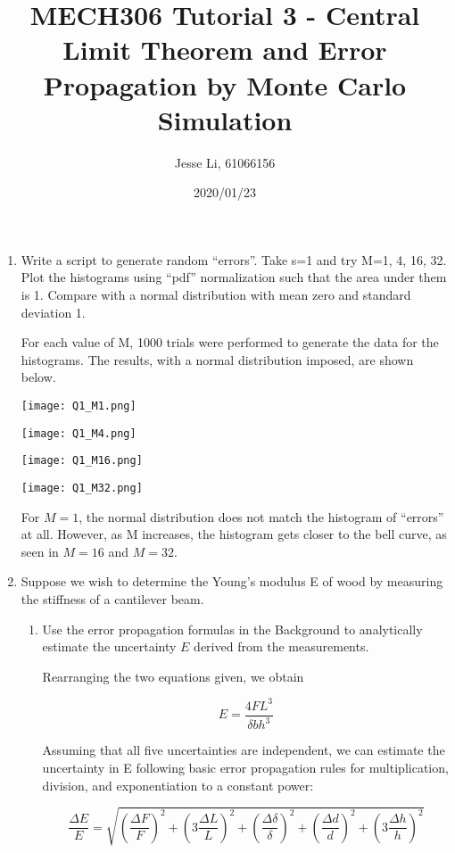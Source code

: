 \documentclass{article}
\begin{document}
\author{Jesse Li, 61066156}
\date{2020/01/23}
\title{MECH306 Tutorial 3 - Central Limit Theorem and Error Propagation by Monte Carlo Simulation}

\maketitle

\begin{enumerate}
    \item Write a script to generate random “errors”. Take s=1 and try M=1, 4, 16, 32. Plot the histograms using “pdf” normalization such that the area under them is 1. Compare with a normal distribution with mean zero and standard deviation 1.


For each value of M, 1000 trials were performed to generate the data for the histograms. The results, with a normal distribution imposed, are shown below.

\texttt{[image: Q1\_M1.png]}

\texttt{[image: Q1\_M4.png]}

\texttt{[image: Q1\_M16.png]}

\texttt{[image: Q1\_M32.png]}

For \(M = 1\), the normal distribution does not match the histogram of “errors” at all. However, as M increases, the histogram gets closer to the bell curve, as seen in \(M=16\) and \(M=32\).


\item Suppose we wish to determine the Young’s modulus E of wood by measuring the stiffness of a cantilever beam.
\begin{enumerate}
    \item Use the error propagation formulas in the Background to analytically estimate the uncertainty $E$ derived from the measurements.

Rearranging the two equations given, we obtain

\[ E=\frac{4FL^3}{\delta b h^3} \]

Assuming that all five uncertainties are independent, we can estimate the uncertainty in E following basic error propagation rules for multiplication, division, and exponentiation to a constant power:

\newcommand{\reluncer}[2][]{\left( #1 \frac{\Delta #2}{#2} \right)^2 }

\begin{equation}
\frac{\Delta E}{E} = \sqrt{\reluncer{F} + \reluncer[3]{L} + \reluncer{\delta} + \reluncer{d} + \reluncer[3]{h}}
\end{equation}



\end{enumerate}
\end{enumerate}
\end{document}
